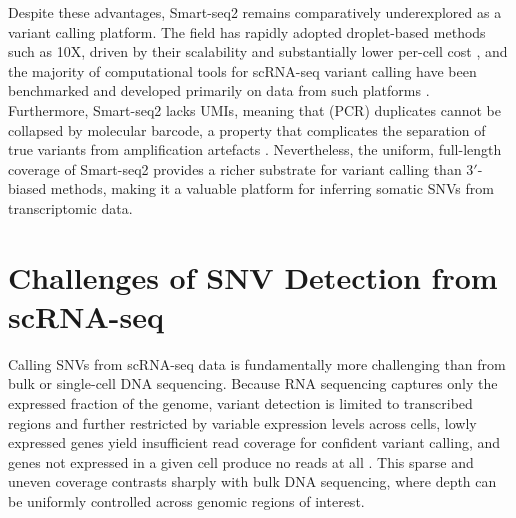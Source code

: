 Despite these advantages, Smart-seq2 remains comparatively underexplored as a variant calling platform. 
The field has rapidly adopted droplet-based methods such as 10X, driven by their scalability and substantially lower per-cell cost \parencite{WangDirectComparative2021}, and the majority of computational tools for scRNA-seq variant calling have been benchmarked and developed primarily on data from such platforms \parencite{LiuSystematiccomparative2019}.
Furthermore, Smart-seq2 lacks UMIs, meaning that  (PCR) duplicates cannot be collapsed by molecular barcode, a property that complicates the separation of true variants from amplification artefacts \parencite{PicelFulllengthRNAseq2014}. 
Nevertheless, the uniform, full-length coverage of Smart-seq2 provides a richer substrate for variant calling than 3$'$-biased methods, making it a valuable platform for inferring somatic SNVs from transcriptomic data.

\section{Challenges of SNV Detection from scRNA-seq}



Calling SNVs from scRNA-seq data is fundamentally more challenging than from bulk or single-cell DNA sequencing. 
Because RNA sequencing captures only the expressed fraction of the genome, variant detection is limited to transcribed regions and further restricted by variable expression levels across cells, lowly expressed genes yield insufficient read coverage for confident variant calling, and genes not expressed in a given cell produce no reads at all \parencite{LiuSystematiccomparative2019,VuCelllevelsomatic2019}. 
This sparse and uneven coverage contrasts sharply with bulk DNA sequencing, where depth can be uniformly controlled across genomic regions of interest.

